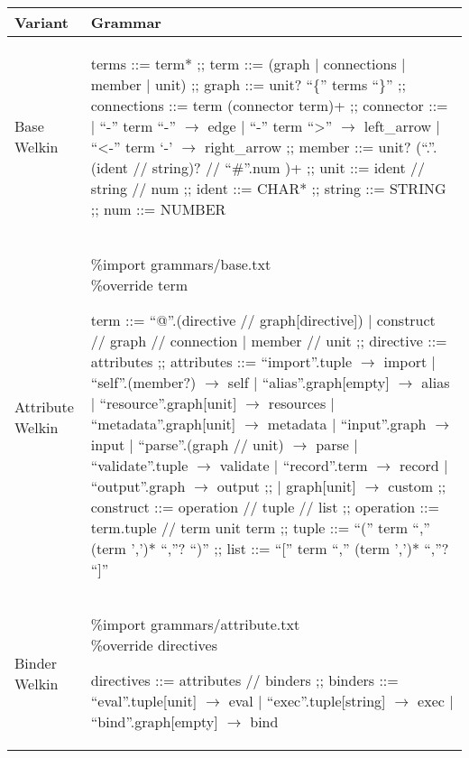 \begin{table}[hbt!]
  \centering
    \begin{tabular}{| p{1.5cm} | p{9.5cm} |}%
    \hline
    Variant & Grammar \\\hline %
      \makecell{Base \\ Welkin} &
  \begin{bnf}
  terms ::= term* ;;
  term ::= (graph | connections | member | unit) ;;
  graph ::= unit? ``\{'' terms ``\}'' ;;
  connections ::= term (connector term)+ ;;
	connector ::=
   | ``-'' term ``-'' $\to$ edge
   | ``-'' term ``>'' $\to$ left\_arrow
	 | ``<-'' term `-' $\to$ right\_arrow ;;
  member ::= unit? (``.''.(ident // string)? // ``\#''.num )+ ;;
	unit ::= ident // string // num ;;
  ident ::= CHAR* ;;
	string ::= STRING ;;
	num ::= NUMBER
\end{bnf} \\ %
   \hline
      Attribute Welkin &
  \makecell{\%import grammars/base.txt \\ \%override term}
  \begin{bnf}
  term ::= ``@''.(directive // graph[directive]) | construct // graph // connection | member // unit ;;
  directive ::= attributes ;;
  attributes ::= ``import''.tuple $\to$ import
  | ``self''.(member?) $\to$ self
  | ``alias''.graph[empty] $\to$ alias
  | ``resource''.graph[unit] $\to$ resources
  | ``metadata''.graph[unit] $\to$ metadata
  | ``input''.graph $\to$ input
  | ``parse''.(graph // unit) $\to $ parse
  | ``validate''.tuple $\to$ validate
  | ``record''.term $\to$ record
  | ``output''.graph $\to$ output ;;
  | graph[unit] $\to$ custom ;;
  construct ::= operation // tuple // list ;;
  operation ::= term.tuple // term unit term ;;
  tuple ::= ``('' term ``,'' (term ',')* ``,''? ``)'' ;;
  list ::= ``['' term ``,'' (term ',')* ``,''? ``]''
 \end{bnf} \\
   \hline
   Binder Welkin &
\makecell{\%import grammars/attribute.txt \\ \%override directives}
    \begin{bnf}
     directives ::= attributes // binders ;;
     binders ::= ``eval''.tuple[unit] $\to$ eval
     | ``exec''.tuple[string] $\to$ exec
     | ``bind''.graph[empty] $\to$ bind
   \end{bnf} \\
    \hline
    \end{tabular}
  \end{table}

